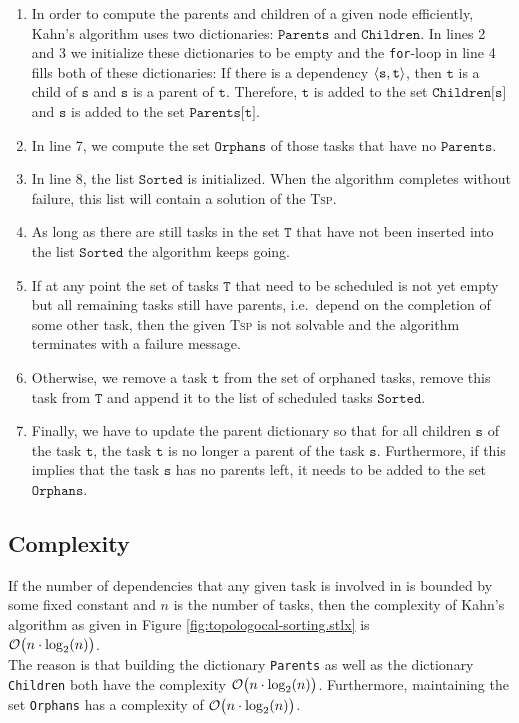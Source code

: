 \begin{enumerate}
\item In order to compute the parents and children of a given node efficiently, Kahn's algorithm
      uses two dictionaries: $\texttt{Parents}$ and $\texttt{Children}$.
      In lines 2 and 3 we initialize these dictionaries to be empty and the \texttt{for}-loop in line 4 fills both of these
      dictionaries: If there is a dependency $\pair(\texttt{s}, \texttt{t})$, then $\texttt{t}$ is a child of
      $\texttt{s}$ and $\texttt{s}$ is a parent of $\texttt{t}$.  Therefore, $\texttt{t}$ is added to the set
      $\texttt{Children[s]}$ and $\texttt{s}$ is added to the set $\texttt{Parents[t]}$.
\item In line 7, we compute the set $\texttt{Orphans}$ of those tasks that have no $\texttt{Parents}$.
\item In line 8, the list $\texttt{Sorted}$ is initialized.  When the algorithm completes without failure, this list will
      contain a solution of the \textsc{Tsp}.
\item As long as there are still tasks in the set $\texttt{T}$ that have not been inserted into the list
      $\texttt{Sorted}$ the algorithm keeps going.
\item If at any point the set of tasks $\texttt{T}$ that need to be scheduled is not yet empty but all remaining
      tasks still have parents, i.e.~depend on the completion of some other task, then the given \textsc{Tsp}
      is not solvable and the algorithm terminates with a failure message.
\item Otherwise, we remove a task $\texttt{t}$ from the set of orphaned tasks, remove this task from $\texttt{T}$
      and append it to the list of scheduled tasks $\texttt{Sorted}$.
\item Finally, we have to update the parent dictionary so that for all children $\texttt{s}$ of the task
      $\texttt{t}$, the task $\texttt{t}$ is no longer a parent of the task $\texttt{s}$.  Furthermore, if this
      implies that the task $\texttt{s}$ has no parents left, it needs to be added to the set $\texttt{Orphans}$.
\end{enumerate}

\subsection{Complexity}
If the number of dependencies that any given task is involved in is bounded by some fixed constant and $n$ is
the number of tasks,  then the complexity of Kahn's algorithm as given in Figure \ref{fig:topologocal-sorting.stlx}
is  
\\[0.2cm]
\hspace*{1.3cm}
$\mathcal{O}\bigl(n \cdot \log_2(n)\bigr)$.
\\[0.2cm]
The reason is that building the dictionary \texttt{Parents} as well as the dictionary \texttt{Children} both
have the complexity $\mathcal{O}\bigl(n \cdot \log_2(n)\bigr)$. Furthermore, maintaining  the set \texttt{Orphans} has a complexity of
$\mathcal{O}\bigl(n \cdot \log_2(n)\bigr)$.





